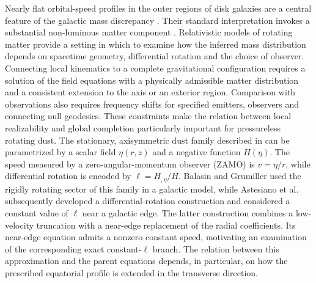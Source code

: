 \documentclass[amsmath,amsfonts,amssymb,aps,pra,superscriptaddress,10pt]{revtex4-2}
\numberwithin{equation}{section}
\theoremstyle{plain}
\theoremstyle{definition}
\theoremstyle{remark}
\theoremstyle{definition}
\begin{document}
Nearly flat orbital-speed profiles in the outer regions of disk galaxies are a central feature of the galactic mass discrepancy \cite{Lelli2016AJ}. Their standard interpretation invokes a substantial non-luminous matter component \cite{BertoneHooper2018RMP}. Relativistic models of rotating matter provide a setting in which to examine how the inferred mass distribution depends on spacetime geometry, differential rotation and the choice of observer. Connecting local kinematics to a complete gravitational configuration requires a solution of the field equations with a physically admissible matter distribution and a consistent extension to the axis or an exterior region. Comparison with observations also requires frequency shifts for specified emitters, observers and connecting null geodesics. These constraints make the relation between local realizability and global completion particularly important for pressureless rotating dust. The stationary, axisymmetric dust family described in \cite{Winicour1975JMP, Stephani2003Exact} can be parametrized by a scalar field $\eta(r,z)$ and a negative function $H(\eta)$. The speed measured by a zero-angular-momentum observer (ZAMO) is $v=\eta/r$, while differential rotation is encoded by $\ell=H_{,\eta}/H$. Balasin and Grumiller \cite{Balasin2008IJMPD} used the rigidly rotating sector of this family in a galactic model, while Astesiano et al.  \cite{Astesiano2022EPJC} subsequently developed a differential-rotation construction and considered a constant value of $\ell$ near a galactic edge. The latter construction combines a low-velocity truncation with a near-edge replacement of the radial coefficients. Its near-edge equation admits a nonzero constant speed, motivating an examination of the corresponding exact constant-$\ell$ branch. The relation between this approximation and the parent equations depends, in particular, on how the prescribed equatorial profile is extended in the transverse direction.
\end{document}
